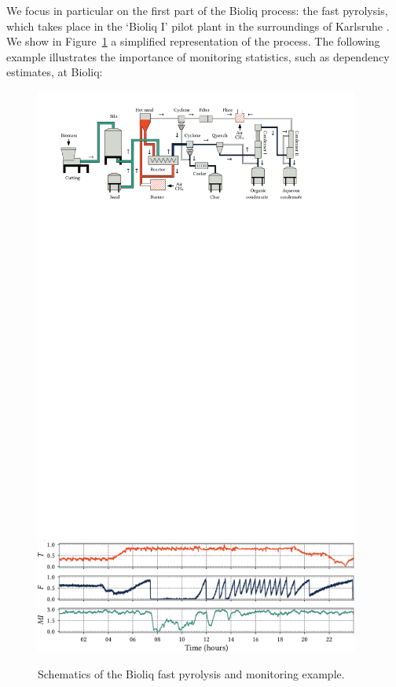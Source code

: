 We focus in particular on the first part of the \gls{Bioliq} process: the fast pyrolysis, which takes place in the `Bioliq I' pilot plant in the surroundings of Karlsruhe \cite{pfitzer2016fast}. We show in Figure~\ref{fig:bioliq_schematics} a simplified representation of the process. The following example illustrates the importance of monitoring statistics, such as dependency estimates, at \gls{Bioliq}:
\begin{figure}
	\centering
	\hfill\includegraphics[width=0.95\textwidth]{part1-figures/bioliq_schematics_2-compressed.pdf}\hfill
	\vspace{0.3cm}
	\hfill\includegraphics[width=0.95\textwidth]{part1-figures/bioliq_prep_s-crop-compressed.pdf}\hfill
	\caption{Schematics of the \acrshort{Bioliq} fast pyrolysis and monitoring example.}\label{fig:bioliq_schematics}
\end{figure}

